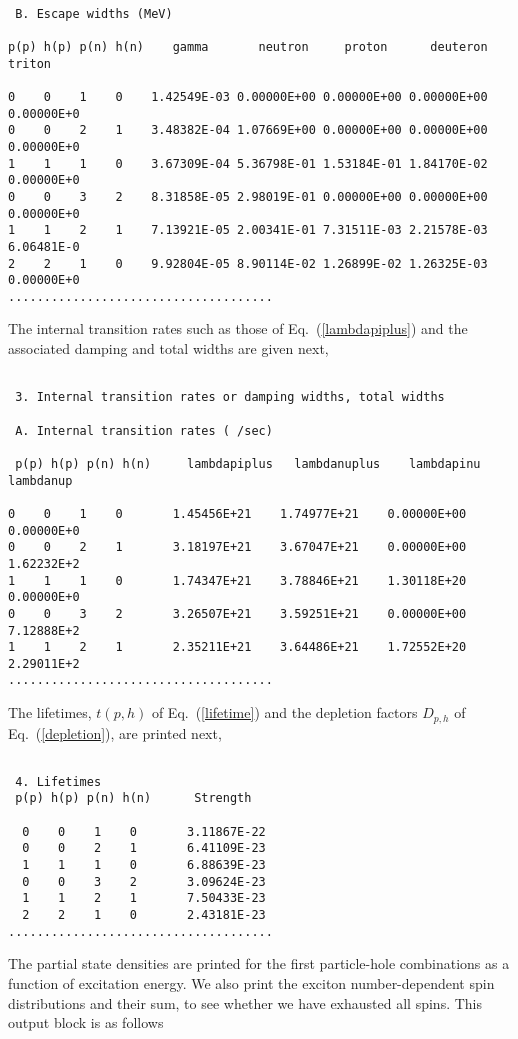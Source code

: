\begin{samplecase}
{\small \begin{verbatim}

 B. Escape widths (MeV)

p(p) h(p) p(n) h(n)    gamma       neutron     proton      deuteron    triton  

0    0    1    0    1.42549E-03 0.00000E+00 0.00000E+00 0.00000E+00 0.00000E+0
0    0    2    1    3.48382E-04 1.07669E+00 0.00000E+00 0.00000E+00 0.00000E+0
1    1    1    0    3.67309E-04 5.36798E-01 1.53184E-01 1.84170E-02 0.00000E+0
0    0    3    2    8.31858E-05 2.98019E-01 0.00000E+00 0.00000E+00 0.00000E+0
1    1    2    1    7.13921E-05 2.00341E-01 7.31511E-03 2.21578E-03 6.06481E-0
2    2    1    0    9.92804E-05 8.90114E-02 1.26899E-02 1.26325E-03 0.00000E+0
.....................................
\end{verbatim} } \renewcommand{\baselinestretch}{1.07}\small\normalsize
\noindent
The internal transition rates such as those of Eq.~(\ref{lambdapiplus}) and 
the associated damping and total widths are given next, 

{\small \begin{verbatim}

 3. Internal transition rates or damping widths, total widths

 A. Internal transition rates ( /sec)

 p(p) h(p) p(n) h(n)     lambdapiplus   lambdanuplus    lambdapinu     lambdanup

0    0    1    0       1.45456E+21    1.74977E+21    0.00000E+00    0.00000E+0
0    0    2    1       3.18197E+21    3.67047E+21    0.00000E+00    1.62232E+2
1    1    1    0       1.74347E+21    3.78846E+21    1.30118E+20    0.00000E+0
0    0    3    2       3.26507E+21    3.59251E+21    0.00000E+00    7.12888E+2
1    1    2    1       2.35211E+21    3.64486E+21    1.72552E+20    2.29011E+2
.....................................
\end{verbatim} } \renewcommand{\baselinestretch}{1.07}\small\normalsize
\noindent
The lifetimes, $t(p,h)$ of Eq.~(\ref{lifetime}) and the depletion factors 
$D_{p,h}$ of Eq.~(\ref{depletion}), are printed next, 

{\small \begin{verbatim}

 4. Lifetimes
 p(p) h(p) p(n) h(n)      Strength

  0    0    1    0       3.11867E-22
  0    0    2    1       6.41109E-23
  1    1    1    0       6.88639E-23
  0    0    3    2       3.09624E-23
  1    1    2    1       7.50433E-23
  2    2    1    0       2.43181E-23
.....................................
\end{verbatim} } \renewcommand{\baselinestretch}{1.07}\small\normalsize
\noindent
The partial state densities are printed for the first particle-hole 
combinations as a function of excitation energy. We also print the exciton 
number-dependent spin distributions and their sum, to see whether we have 
exhausted all spins. This output block is as follows


\end{samplecase}
